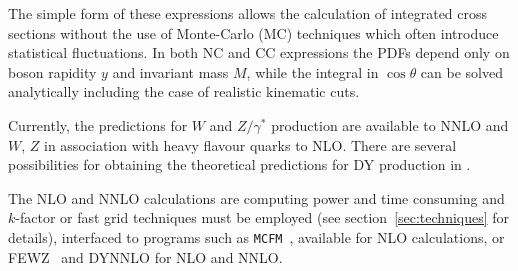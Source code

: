 The simple form of these expressions allows the calculation of integrated
cross sections without the use of Monte-Carlo (MC) techniques which often 
introduce statistical fluctuations.
In both NC and CC expressions the PDFs depend only on boson rapidity \(y\) and
invariant mass \(M\), while
the integral in \(\cos\theta\) can be solved analytically
including the case of realistic kinematic cuts.
%

Currently, the predictions for $W$ and $Z/\gamma^*$ production are available
to NNLO and $W$, $Z$ in association with heavy flavour quarks to NLO. There are several possibilities 
for obtaining the theoretical
predictions for DY production in \fitter. 

The NLO and NNLO calculations are computing power and time consuming
and $k$-factor or fast grid techniques must be employed (see section~\ref{sec:techniques}
for details), interfaced to programs such as
\texttt{MCFM}~\cite{Campbell:1999ah,Campbell:2000je,Campbell:2010ff}, 
available for NLO calculations, or 
FEWZ~\cite{FEWZ} and DYNNLO \cite{DYNNLO} for NLO and NNLO.
 





